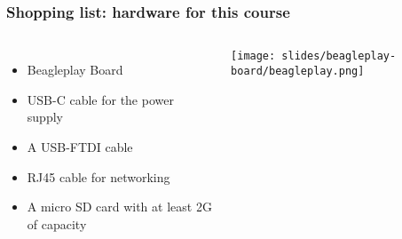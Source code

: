 \begin{frame}
\frametitle{Shopping list: hardware for this course}
  \begin{columns}
    \footnotesize
    \begin{itemize}
      \item Beagleplay Board
      \item USB-C cable for the power supply
      \item A USB-FTDI cable
      \item RJ45 cable for networking
      \item A micro SD card with at least 2G of capacity
    \end{itemize}
    \vspace{1cm}
    \texttt{[image: slides/beagleplay-board/beagleplay.png]}
  \end{columns}
\end{frame}
